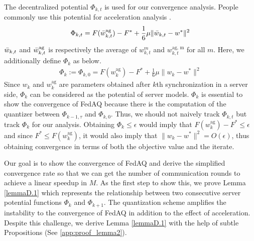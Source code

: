 \documentclass[11pt]{article}
\begin{document}
The decentralized potential $\Phi_{k, t}$ \cite{Yeojoon-yuan2020federated} is used for our convergence analysis. People commonly use this potential for acceleration analysis \cite{Yeojoon-bansal2019potential}.
\begin{gather*}
    \Phi_{k, t} = F(\Bar{w}_{k, t}^{\textrm{ag}}) -F^* + \frac{1}{6} \mu \|\Bar{w}_{k, t} - w^*\|^2
\end{gather*}
$\Bar{w}_{k, t}$ and $\Bar{w}_{k, t}^{\textrm{ag}}$ is respectively the average of $w_{k, t}^m$ and $w_{k, t}^{\textrm{ag, m}}$ for all $m$. Here, we additionally define $\Phi_k$ as below.
\begin{gather*}
    \Phi_k := \Phi_{k, 0} = F(w_k^{\textrm{ag}}) - F^* + \frac{1}{6} \mu \|w_k - w^*\|^2
\end{gather*}
Since $w_k$ and $w_k^{\textrm{ag}}$ are parameters obtained after $k$th synchronization in a server side, $\Phi_k$ can be considered as the potential of server models. $\Phi_k$ is essential to show the convergence of FedAQ because there is the computation of the quantizer between $\Phi_{k-1, \tau}$ and $\Phi_{k, 0}$. Thus, we should not naively track $\Phi_{k, t}$ but track $\Phi_k$ for our analysis. Obtaining $\Phi_k \leq \epsilon$ would imply that $F(w_k^{\textrm{ag}}) - F^* \leq \epsilon$ and since $F^* \leq F(w_k^{\textrm{ag}})$, it would also imply that $\|w_k - w^*\|^2 = O(\epsilon)$, thus obtaining convergence in terms of both the objective value and the iterate.

Our goal is to show the convergence of FedAQ and derive the simplified convergence rate so that we can get the number of communication rounds to achieve a linear speedup in $M$. As the first step to show this, we prove Lemma \ref{lemmaD.1} which represents the relationship between two consecutive server potential functions $\Phi_k$ and $\Phi_{k+1}$. The quantization scheme amplifies the instability to the convergence of FedAQ in addition to the effect of acceleration. Despite this challenge, we derive Lemma \ref{lemmaD.1} with the help of subtle Propositions (See \cref{app:proof_lemma2}).
\end{document}
